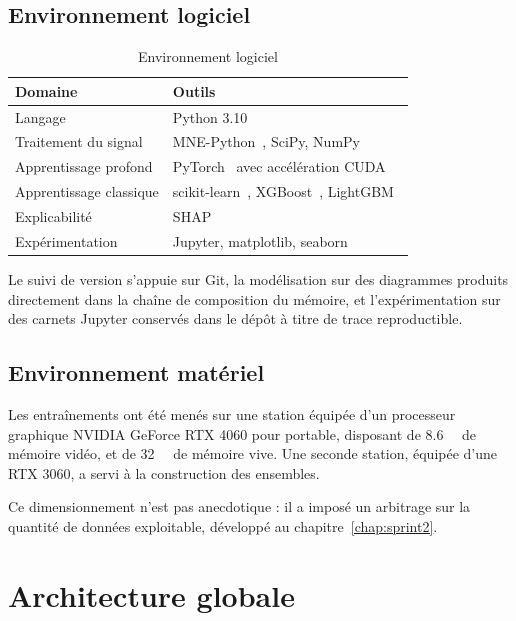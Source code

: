 \subsection{Environnement logiciel}

\begin{table}[H]
\centering

\small
\begin{tabular}{@{}lL{9.6cm}@{}}
\toprule
\textbf{Domaine} & \textbf{Outils} \\
\midrule
Langage & Python 3.10 \\
Traitement du signal & MNE-Python~\cite{gramfort2013}, SciPy, NumPy \\
Apprentissage profond & PyTorch~\cite{paszke2019} avec accélération CUDA \\
Apprentissage classique & scikit-learn~\cite{pedregosa2011},
XGBoost~\cite{chen2016}, LightGBM~\cite{ke2017} \\
Explicabilité & SHAP~\cite{lundberg2017,lundberg2020} \\
Expérimentation & Jupyter, matplotlib, seaborn \\
\bottomrule
\end{tabular}
\caption{Environnement logiciel}
\label{tab:environnement}
\end{table}

Le suivi de version s'appuie sur Git, la modélisation sur des diagrammes produits
directement dans la chaîne de composition du mémoire, et l'expérimentation sur des
carnets Jupyter conservés dans le dépôt à titre de trace reproductible.

\subsection{Environnement matériel}

Les entraînements ont été menés sur une station équipée d'un processeur graphique
NVIDIA GeForce RTX 4060 pour portable, disposant de \SI{8,6}{\giga\octet} de mémoire
vidéo, et de \SI{32}{\giga\octet} de mémoire vive. Une seconde station, équipée d'une
RTX 3060, a servi à la construction des ensembles.

Ce dimensionnement n'est pas anecdotique : il a imposé un arbitrage sur la quantité de
données exploitable, développé au chapitre~\ref{chap:sprint2}.

\section{Architecture globale}

